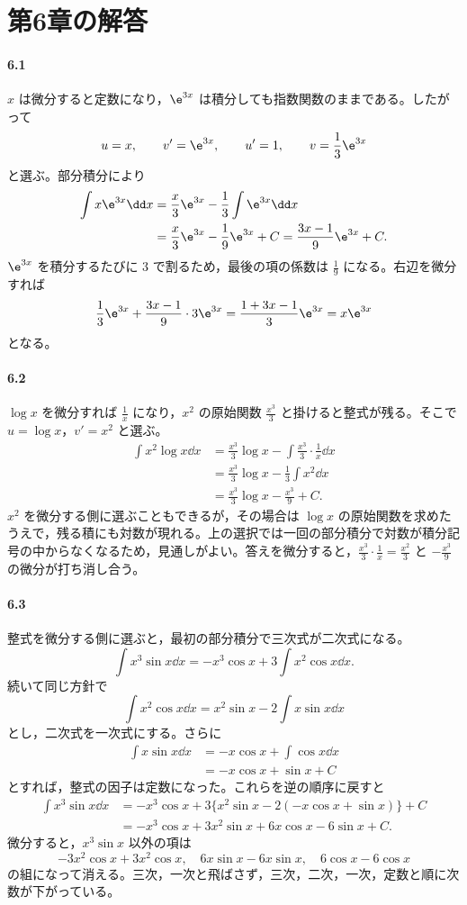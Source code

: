 \section{第6章の解答}\label{解答:第6章}

\paragraph{6.1}
$x$ は微分すると定数になり，$\e^{3x}$ は積分しても指数関数のままである。したがって
\[
 u=x,\qquad v'=\e^{3x},\qquad
 u'=1,\qquad v=\frac13\e^{3x}
\]
と選ぶ。部分積分により
\[
\begin{aligned}
 \int x\e^{3x}\dd x
 &=\frac x3\e^{3x}-\frac13\int\e^{3x}\dd x\\
 &=\frac x3\e^{3x}-\frac19\e^{3x}+C
 =\frac{3x-1}{9}\e^{3x}+C.
\end{aligned}
\]
$\e^{3x}$ を積分するたびに $3$ で割るため，最後の項の係数は $\frac19$ になる。右辺を微分すれば
\[
 \frac13\e^{3x}
 +\frac{3x-1}{9}\cdot3\e^{3x}
 =\frac{1+3x-1}{3}\e^{3x}=x\e^{3x}
\]
となる。

\paragraph{6.2}
$\log x$ を微分すれば $\frac1x$ になり，$x^2$ の原始関数 $\frac{x^3}{3}$ と掛けると整式が残る。そこで $u=\log x$，$v'=x^2$ と選ぶ。
\[
\begin{aligned}
 \int x^2\log x\dd x
 &=\frac{x^3}{3}\log x
  -\int\frac{x^3}{3}\cdot\frac1x\dd x\\
 &=\frac{x^3}{3}\log x-\frac13\int x^2\dd x\\
 &=\frac{x^3}{3}\log x-\frac{x^3}{9}+C.
\end{aligned}
\]
$x^2$ を微分する側に選ぶこともできるが，その場合は $\log x$ の原始関数を求めたうえで，残る積にも対数が現れる。上の選択では一回の部分積分で対数が積分記号の中からなくなるため，見通しがよい。答えを微分すると，$\frac{x^3}{3}\cdot\frac1x=\frac{x^2}{3}$ と $-\frac{x^3}{9}$ の微分が打ち消し合う。

\paragraph{6.3}
整式を微分する側に選ぶと，最初の部分積分で三次式が二次式になる。
\[
 \int x^3\sin x\dd x
 =-x^3\cos x+3\int x^2\cos x\dd x.
\]
続いて同じ方針で
\[
 \int x^2\cos x\dd x
 =x^2\sin x-2\int x\sin x\dd x
\]
とし，二次式を一次式にする。さらに
\[
\begin{aligned}
 \int x\sin x\dd x
 &=-x\cos x+\int\cos x\dd x\\
 &=-x\cos x+\sin x+C
\end{aligned}
\]
とすれば，整式の因子は定数になった。これらを逆の順序に戻すと
\[
\begin{aligned}
 \int x^3\sin x\dd x
 &=-x^3\cos x
   +3\{x^2\sin x-2(-x\cos x+\sin x)\}+C\\
 &=-x^3\cos x+3x^2\sin x+6x\cos x-6\sin x+C.
\end{aligned}
\]
微分すると，$x^3\sin x$ 以外の項は
\[
 -3x^2\cos x+3x^2\cos x,
 \quad 6x\sin x-6x\sin x,
 \quad 6\cos x-6\cos x
\]
の組になって消える。三次，一次と飛ばさず，三次，二次，一次，定数と順に次数が下がっている。

